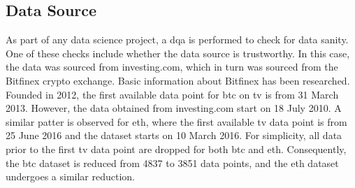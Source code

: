 \subsection{Data Source}
\label{sub:Data_Source}
As part of any data science project, a \gls{dqa} is performed to check for data sanity. One of these checks include whether the data source is trustworthy. In this case, the data was sourced from investing.com, which in turn was sourced from the Bitfinex crypto exchange.
\newline
\newline
Basic information about Bitfinex has been researched. Founded in 2012, the first available data point for \gls{btc} on \gls{tv} is from 31 March 2013. However, the data obtained from investing.com start on 18 July 2010. A similar patter is observed for \gls{eth}, where the first available \gls{tv} data point is from 25 June 2016 and the dataset starts on 10 March 2016.
\newline
\newline
For simplicity, all data prior to the first \gls{tv} data point are dropped for both \gls{btc} and \gls{eth}. Consequently, the \gls{btc} dataset is reduced from 4837 to 3851 data points, and the \gls{eth} dataset undergoes a similar reduction.